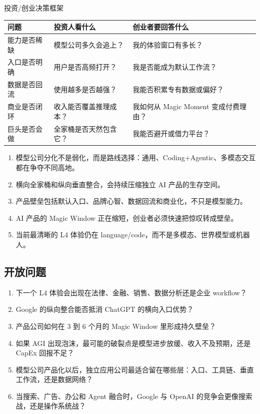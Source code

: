\documentclass[a4paper]{article}
\begin{document}
\begin{knowledgebox}{投资/创业决策框架}
\begin{tabularx}{\textwidth}{p{}p{}X}
\toprule
问题 & 投资人看什么 & 创业者要回答什么 \\
\midrule
能力是否稀缺 & 模型公司多久会追上？ & 我的体验窗口有多长？ \\
入口是否明确 & 用户是否高频打开？ & 我是否能成为默认工作流？ \\
数据是否回流 & 使用越多是否越强？ & 我能否积累专有数据或偏好？ \\
商业是否闭环 & 收入能否覆盖推理成本？ & 我如何从 Magic Moment 变成付费理由？ \\
巨头是否会做 & 全家桶是否天然包含它？ & 我能否避开或借力平台？ \\
\bottomrule
\end{tabularx}
\end{knowledgebox}

\begin{enumerate}
\item 模型公司分化不是弱化，而是路线选择：通用、Coding+Agentic、多模态交互都在争夺不同高地。
\item 横向全家桶和纵向垂直整合，会持续压缩独立 AI 产品的生存空间。
\item 产品壁垒包括默认入口、品牌心智、数据回流和商业化，不只是模型能力。
\item AI 产品的 Magic Window 正在缩短，创业者必须快速把惊叹转成壁垒。
\item 当前最清晰的 L4 体验仍在 language/code，而不是多模态、世界模型或机器人。
\end{enumerate}

\subsection{开放问题}

\begin{enumerate}
\item 下一个 L4 体验会出现在法律、金融、销售、数据分析还是企业 workflow？
\item Google 的纵向整合能否抵消 ChatGPT 的横向入口优势？
\item 产品公司如何在 3 到 6 个月的 Magic Window 里形成持久壁垒？
\item 如果 AGI 出现泡沫，最可能的破裂点是模型进步放缓、收入不及预期，还是 CapEx 回报不足？
\item 模型公司产品化以后，独立应用公司最适合留在哪些层：入口、工具链、垂直工作流，还是数据网络？
\item 当搜索、广告、办公和 Agent 融合时，Google 与 OpenAI 的竞争会更像搜索战，还是操作系统战？
\end{enumerate}
\end{document}
